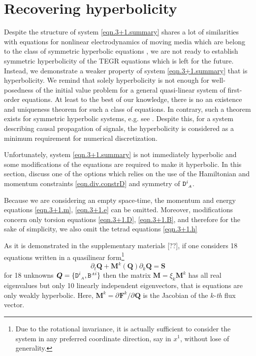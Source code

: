 \documentclass[
10pt, %
a4paper, %
oneside, %
headinclude,footinclude, %
BCOR5mm, %
]{scrartcl}
\newcommand{\sA}{\mathsmaller A}
\newcommand{\pd}[1]{\partial_{#1}}
\newcommand{\Dfin}[2]{\mathtt{D}_{\phantom{#2}#1}^{#2}}	%
\newcommand{\Bfin}[2]{\mathtt{B}^{#1#2}}	%
\begin{document}
\section{Recovering hyperbolicity}

Despite the structure of system \eqref{eqn.3+1.summary} shares a lot of similarities with equations 
for nonlinear electrodynamics of moving media which are belong to the class of symmetric hyperbolic 
equations \cite{SHTC-GENERIC-CMAT,Rom1998,Rom2001,God1961}, we are not ready to establish symmetric 
hyperbolicity of the TEGR equations which is left for the future. Instead, we demonstrate a weaker 
property of system \eqref{eqn.3+1.summary} that is hyperbolicity. We remind that solely hyperbolicity 
is not enough for well-posedness of the initial value problem for a general quasi-linear system of 
first-order equations. At least to the best of our knowledge, there is no an existence and uniqueness 
theorem for such a class of equations. In contrary, such a theorem exists for symmetric hyperbolic 
systems, e.g. see \cite{Serre2007}. Despite this, for a system describing causal propagation of 
signals, the hyperbolicity is considered as a minimum requirement for numerical discretization.  

Unfortunately, system \eqref{eqn.3+1.summary} is not immediately hyperbolic and some 
modifications of the equations are required to make it hyperbolic. In this section, discuss one of 
the options which relies on the use of the Hamiltonian and momentum constraints 
\eqref{eqn.div.constrD} and symmetry of $ \Dfin{\sA}{i} $. 

Because we are considering an empty space-time, the momentum and energy equations \eqref{eqn.3+1.m}, 
\eqref{eqn.3+1.e} can be omitted. Moreover, modifications concern only torsion equations 
\eqref{eqn.3+1.D}, \eqref{eqn.3+1.B}, and 
therefore for the sake of simplicity, we also omit the tetrad equations \eqref{eqn.3+1.h}

As it is demonstrated in the supplementary materials [??], if one considers 18 equations written in a 
quasilinear form\footnote{Due to the rotational invariance, 
it is actually sufficient to consider the system in any preferred coordinate direction, say in $ x^1 
$, without lose of generality.}
\begin{equation}\label{eqn.quasi.lin}
	\pd{t} \bm{Q} + \bm{M}^k(\bm{Q})\pd{k} \bm{Q} = \bm{S}
\end{equation}
for 18 unknowns $ \bm{Q}=\{ \Dfin{\sA}{i}, \Bfin{\sA}{i} \} $ then the matrix $ \bm{M} = \xi_k 
\bm{M}^k $ has all real eigenvalues but only 10 linearly independent eigenvectors, that is equations 
are only 
weakly hyperbolic. Here, $ \bm{M}^k =
\pd{}\bm{F}^k/\pd{}\bm{Q} $ is the Jacobian of the $ k $-\textit{th} flux vector.
\end{document}
